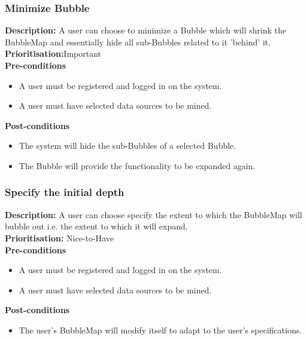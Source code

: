 \documentclass[hidelinks,english]{article}
\begin{document}
    		\subsubsection{Minimize Bubble}
				\textbf{Description:}  A user can choose to minimize a Bubble which will shrink the BubbleMap and essentially hide all sub-Bubbles related to it 'behind' it.
				\\
    			\textbf{Prioritisation:}Important\\
    			\textbf{Pre-conditions}
			    \begin{itemize}
			        \item A user must be registered and logged in on the system.
			        \item A user must have selected data sources to be mined.
			    \end{itemize}
			    \textbf{Post-conditions}
			     \begin{itemize}
			        \item The system will hide the sub-Bubbles of a selected Bubble.
			       \item The Bubble will provide the functionality to be expanded again.
			    \end{itemize}
    		\subsubsection{Specify the initial depth}
				\textbf{Description:}  A user can choose specify the extent to which the BubbleMap will bubble out i.e. the extent to which it will expand.
				\\
			    \textbf{Prioritisation:} Nice-to-Have\\
      			\textbf{Pre-conditions}
			    \begin{itemize}
			        \item A user must be registered and logged in on the system.
			        \item A user must have selected data sources to be mined.
			    \end{itemize}
    			\textbf{Post-conditions}
     			\begin{itemize}
        			\item The user's BubbleMap will modify itself to adapt to the user's specifications.
    			\end{itemize}
\end{document}
